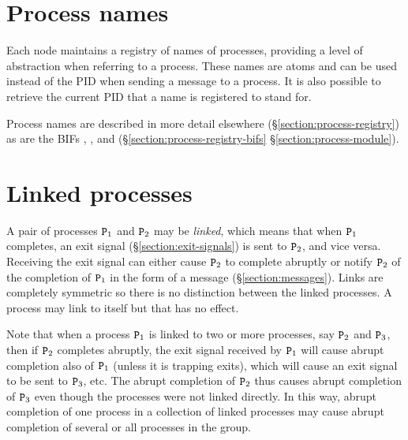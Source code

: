 \section{Process names}

\label{section:process-names}

Each node maintains a registry of names of processes, providing a level
of abstraction when referring to a process.  These names are atoms and
can be used instead of the PID when sending a message to a process.
It is also possible to retrieve the current PID that a name is
registered to stand for.

Process names are described in more detail elsewhere
(\S\ref{section:process-registry}) as are the BIFs
, ,  and 
(\ifOld\S\ref{section:process-registry-bifs}\fi
\ifNew\S\ref{section:process-module}\fi).

\section{Linked processes}

\label{section:links}

A pair of processes ${\tt{\sl P}}_1$ and ${\tt{\sl P}}_2$
may be \emph{linked},
which means that when
${\tt{\sl P}}_1$ completes, an exit signal (\S\ref{section:exit-signals}) is sent to
${\tt{\sl P}}_2$, and vice versa. Receiving the exit signal can either cause ${\tt{\sl P}}_2$ to
complete abruptly or notify ${\tt{\sl P}}_2$ of the completion of ${\tt{\sl P}}_1$
in the form of a message (\S\ref{section:messages}). Links are
completely symmetric so there is no distinction between the linked
processes. A process may link to itself but that has no effect.

\iffalse
Although a link is between two processes, the transitive closure of
the links forms groups of processes.  Unless some process in such a
group is trapping exit signals (\S\ref{section:exit-signals}),
completion of one process in the group eventually causes (abrupt)
completion of all processes in the group.
\else
Note that when a process ${\tt{\sl P}}_1$ is linked to two or more processes,
say ${\tt{\sl P}}_2$ and ${\tt{\sl P}}_3$, then if ${\tt{\sl P}}_2$ completes abruptly,
the exit signal received by ${\tt{\sl P}}_1$ will cause abrupt completion also
of ${\tt{\sl P}}_1$ (unless it is trapping exits), which will cause an exit signal
to be sent to ${\tt{\sl P}}_3$, etc.  The abrupt completion of ${\tt{\sl P}}_2$ thus
causes abrupt completion of ${\tt{\sl P}}_3$ even though the processes were not
linked directly.
In this way, abrupt completion of one process in a collection of linked
processes may cause abrupt completion of several or all processes in the group.
\fi


